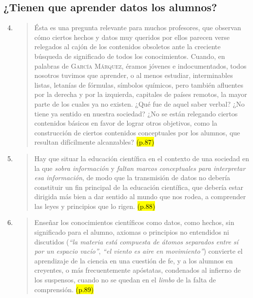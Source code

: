 \documentclass{article}
\begin{document}
\subsection*{¿Tienen que aprender datos los alumnos?}

\begin{enumerate}
  \setcounter{enumi}{3}

  \item \begin{quote}
  Ésta es una pregunta relevante para muchos profesores, que observan cómo ciertos hechos y datos muy queridos por ellos parecen verse relegados al cajón de los contenidos obsoletos ante la creciente búsqueda de significado de todos los conocimientos. Cuando, en palabras de \textsc{García Márquez}, éramos jóvenes e indocumentados, todos nosotros tuvimos que aprender, o al menos estudiar, interminables listas, letanías de fórmulas, símbolos químicos, pero también afluentes por la derecha y por la izquierda, capitales de países remotos, la mayor parte de los cuales ya no existen. ¿Qué fue de aquel saber verbal? ¿No tiene ya sentido en nuestra sociedad? ¿No se están relegando ciertos contenidos básicos en favor de lograr otros objetivos, como la construcción de ciertos contenidos conceptuales por los alumnos, que resultan difícilmente alcanzables? \hl{(p.87)}
  \end{quote}

  \item \begin{quote}
  Hay que situar la educación científica en el contexto de una sociedad en la que \textit{sobra información} y \textit{faltan marcos conceptuales para interpretar esa información}, de modo que la transmisión de datos no debería constituir un fin principal de la educación científica, que debería estar dirigida más bien a dar sentido al mundo que nos rodea, a comprender las leyes y principios que lo rigen. \hl{(p.88)}
  \end{quote}

  \item \begin{quote}
  Enseñar los conocimientos científicos como datos, como hechos, sin significado para el alumno, axiomas o principios no entendidos ni discutidos (\textit{“la materia está compuesta de átomos separados entre sí por un espacio vacío”}, \textit{“el viento es aire en movimiento”}) convierte el aprendizaje de la ciencia en una cuestión de fe, y a los alumnos en creyentes, o más frecuentemente apóstatas, condenados al infierno de los suspensos, cuando no se quedan en el \textit{limbo} de la falta de comprensión. \hl{(p.89)}
  \end{quote}

\end{enumerate}
\end{document}

